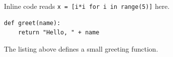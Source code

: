 \documentclass{article}
\begin{document}
Inline code reads \texttt{x = [i*i for i in range(5)]} here.
\begin{verbatim}
def greet(name):
    return "Hello, " + name
\end{verbatim}
The listing above defines a small greeting function.
\end{document}
